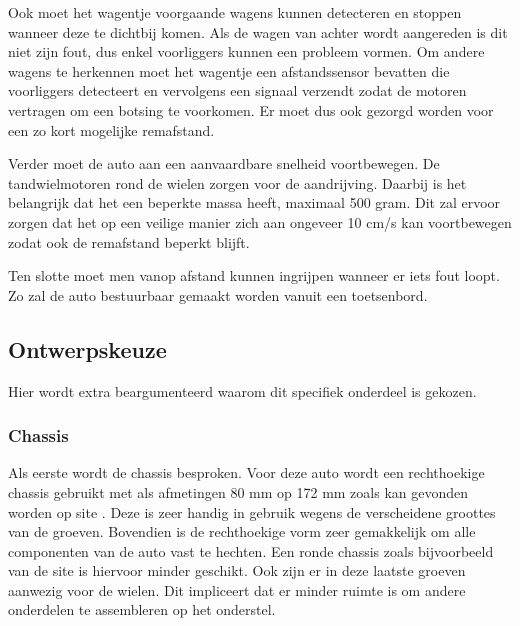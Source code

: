 \documentclass[a4paper,twoside,kulak]{kulakreport} %
\begin{document}
Ook moet het wagentje voorgaande wagens kunnen detecteren en stoppen wanneer deze te dichtbij komen. Als de wagen van achter wordt aangereden is dit niet zijn fout, dus enkel voorliggers kunnen een probleem vormen. Om andere wagens te herkennen moet het wagentje een afstandssensor bevatten die voorliggers detecteert en vervolgens een signaal verzendt zodat de motoren vertragen om een botsing te voorkomen. Er moet dus ook gezorgd worden voor een zo kort mogelijke remafstand.

Verder moet de auto aan een aanvaardbare snelheid voortbewegen. De tandwielmotoren rond de wielen zorgen voor de aandrijving. Daarbij is het belangrijk dat het een beperkte massa heeft, maximaal 500 gram. Dit zal ervoor zorgen dat het op een veilige manier zich aan ongeveer 10 cm/s kan voortbewegen zodat ook de remafstand beperkt blijft.

Ten slotte moet men vanop afstand kunnen ingrijpen wanneer er iets fout loopt. Zo zal de auto bestuurbaar gemaakt worden vanuit een toetsenbord.






\subsection{Ontwerpskeuze}

Hier wordt extra beargumenteerd waarom dit specifiek onderdeel is gekozen.
\label{Ontwerpskeuze}

\subsubsection{Chassis}
Als eerste wordt de chassis besproken. Voor deze auto wordt een rechthoekige chassis gebruikt met als afmetingen 80 mm op 172 mm zoals kan gevonden worden op site \cite{RobotChassisRechthoekigZwart}. %
Deze is zeer handig in gebruik wegens de verscheidene groottes van de groeven. Bovendien is de rechthoekige vorm zeer gemakkelijk om alle componenten van de auto vast te hechten. Een ronde chassis zoals bijvoorbeeld van de site \cite{RobotChassis} is hiervoor minder geschikt. Ook zijn er in deze laatste groeven aanwezig voor de wielen.%
Dit impliceert dat er minder ruimte is om andere onderdelen te assembleren op het onderstel. 
\label{Chassis}
~
\end{document}
